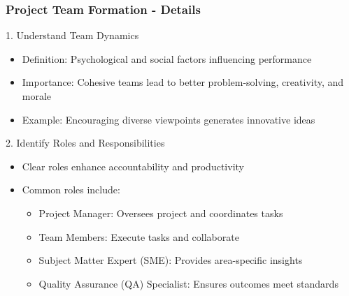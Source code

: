 \documentclass[aspectratio=169]{beamer}
\begin{document}
\begin{frame}[fragile]
    \frametitle{Project Team Formation - Details}
    \begin{block}{1. Understand Team Dynamics}
        \begin{itemize}
            \item Definition: Psychological and social factors influencing performance
            \item Importance: Cohesive teams lead to better problem-solving, creativity, and morale
            \item Example: Encouraging diverse viewpoints generates innovative ideas
        \end{itemize}
    \end{block}
    
    \begin{block}{2. Identify Roles and Responsibilities}
        \begin{itemize}
            \item Clear roles enhance accountability and productivity
            \item Common roles include:
                \begin{itemize}
                    \item Project Manager: Oversees project and coordinates tasks
                    \item Team Members: Execute tasks and collaborate
                    \item Subject Matter Expert (SME): Provides area-specific insights
                    \item Quality Assurance (QA) Specialist: Ensures outcomes meet standards
                \end{itemize}
        \end{itemize}
    \end{block}
\end{frame}
\end{document}
